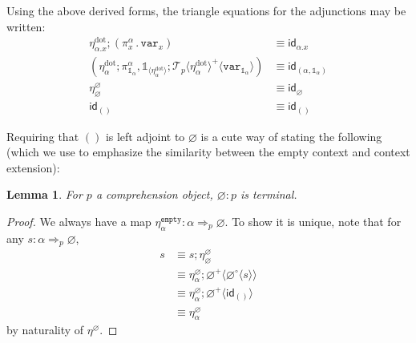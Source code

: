 \documentclass[10pt]{article}
\newtheorem{lemma}{Lemma}
\theoremstyle{definition}
\let\emptyset\varnothing
\newcommand{\tcell}{\Rightarrow}
\newcommand{\id}{\mathsf{id}}
\newcommand\ApEl[2]{\mathcal{T}_{#1}\langle#2\rangle}
\newcommand\bdot[0]{\mathbin{.}}
\newcommand\ApPlus[2]{\ensuremath{{#1}^+ \langle #2 \rangle }}
\newcommand\ApCirc[2]{\ensuremath{{#1}^\circ \langle #2 \rangle }}
\newcommand{\tempty}{\ensuremath{\mathtt{empty}}}
\newcommand{\sdot}{\ensuremath{\mathrm{dot}}}
\newcommand\One{\ensuremath{\mathds{1}}}
\newcommand\var[1]{\ensuremath{\mathtt{var}_{#1}}}
\newcommand\ApOne[1]{\ensuremath{\One_{\langle {#1} \rangle }}}
\begin{document}
Using the above derived forms, the triangle equations for the adjunctions may be written:
\begin{align}
\label{eq:chi-triangle-1} \eta^\sdot_{\alpha.x};(\pi_x^\alpha \bdot \var{x}) &\equiv \id_{\alpha.x} \\
\label{eq:chi-triangle-2} (\eta^\sdot_\alpha ; \pi^\alpha_{\One_\alpha}, \ApOne{\eta^\sdot_\alpha} ; \ApPlus{\ApEl{p}{\eta^\sdot_\alpha}}{\var{\One_\alpha}}) &\equiv \id_{(\alpha, \One_\alpha)}\\
\eta^\emptyset_\emptyset &\equiv \id_\emptyset \\
\id_{()}&\equiv \id_{()}
\end{align}

Requiring that $()$ is left adjoint to $\emptyset$ is a cute way of
stating the following (which we use to emphasize the similarity between
the empty context and context extension):
\begin{lemma}
For $p$ a comprehension object, $\emptyset : p$ is terminal.
\end{lemma}
\begin{proof}
We always have a map $\eta^\tempty_\alpha : \alpha \tcell_p \emptyset$. To show it is unique, note that for any $s : \alpha \tcell_p \emptyset$,
\begin{align*}
s 
&\equiv s ; \eta^\emptyset_\emptyset \\
&\equiv \eta^\emptyset_\alpha ; \ApPlus{\emptyset}{\ApCirc{\emptyset}{s}} \\
&\equiv \eta^\emptyset_\alpha ; \ApPlus{\emptyset}{\id_{()}} \\
&\equiv \eta^\emptyset_\alpha
\end{align*}
by naturality of $\eta^\emptyset$.
\end{proof}
\end{document}
